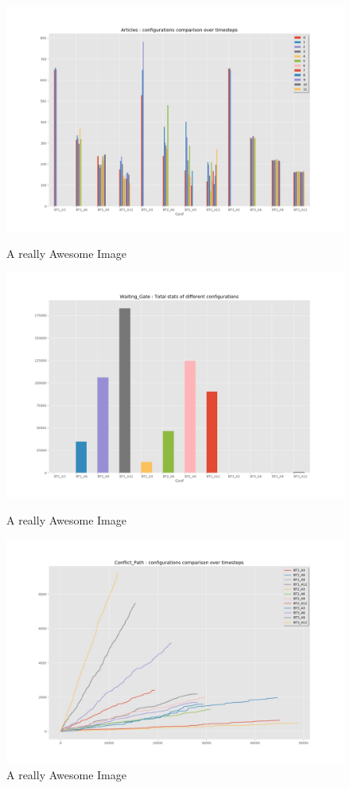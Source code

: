 \documentclass[12pt]{article}
\begin{document}
\begin{figure}[!htb]
  \includegraphics[width=\linewidth]{Figures/Results_Graphics/AGV_Articles.jpg}
  \caption{A really Awesome Image}\label{fig:awesome_image1}
\endminipage\hfill
{}
  \includegraphics[width=\linewidth]{Figures/Results_Graphics/Total_Waiting_Gate.jpg}
  \caption{A really Awesome Image}\label{fig:awesome_image2}
\endminipage\hfill
{}%
  \includegraphics[width=\linewidth]{Figures/Results_Graphics/Timestep_Conflict_Path.jpg}
  \caption{A really Awesome Image}\label{fig:awesome_image3}
\endminipage
\end{figure}
\end{document}
